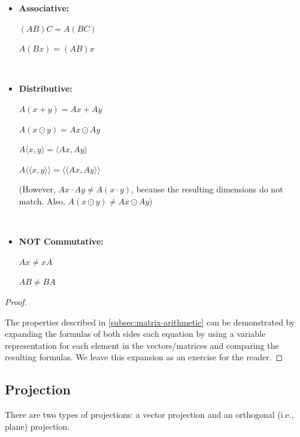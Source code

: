 \begin{tcolorbox}[title={\textbf{\tboxtheorem{\ref*{subsec:matrix-arithmetic}} Matrix Arithmetic Properties}}]

\begin{itemize}

\item \textbf{Associative:} 

$(AB)C = A(BC)$

$A(Bx) = (AB)x$


$ $

 
\item \textbf{Distributive:} 

$A(x + y) = Ax + Ay$

$A(x \odot y) = Ax \odot Ay $

$A\langle x, y\rangle = \langle Ax, Ay\rangle$

$A\langle \langle x, y\rangle\rangle = \langle\langle Ax, Ay\rangle\rangle$

(However, $Ax \cdot Ay \neq A(x \cdot y)$, because the resulting dimensions do not match. Also, $A(x \odot y) \neq Ax \odot Ay $)

$ $

\item \textbf{NOT Commutative:} 

$Ax \neq xA$

$AB \neq BA$


\end{itemize}
\end{tcolorbox}

\begin{proof}

$ $

The properties described in \ref*{subsec:matrix-arithmetic} can be demonstrated by expanding the formulas of both sides each equation by using a variable representation for each element in the vectors/matrices and comparing the resulting formulas. We leave this expansion as an exercise for the reader.

\end{proof}


\subsection{Projection}
\label{subsec:projection}

There are two types of projections: a vector projection and an orthogonal (i.e., plane) projection. 



